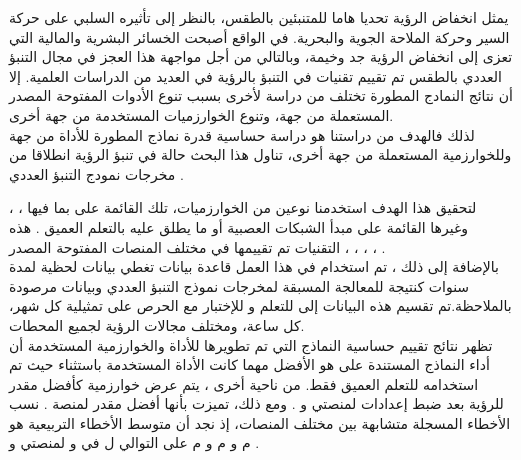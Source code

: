 \documentclass[11pt,a4paper]{report}
\begin{document}
\thispagestyle{empty}

\begin{otherlanguage}{arabic}
يمثل انخفاض الرؤية تحديا هاما للمتنبئين بالطقس، بالنظر إلى تأثيره السلبي على حركة السير وحركة الملاحة الجوية والبحرية. في الواقع أصبحت الخسائر البشرية والمالية التي تعزى إلى انخفاض الرؤية جد وخيمة، وبالتالي من أجل مواجهة هذا العجز في مجال التنبؤ العددي بالطقس تم تقييم تقنيات  في التنبؤ بالرؤية  في العديد من الدراسات العلمية. إلا أن نتائج النمادج المطورة تختلف من دراسة لأخرى بسبب تنوع الأدوات  المفتوحة المصدر المستعملة من جهة، وتنوع الخوارزميات  المستخدمة من جهة أخرى.
\\

لذلك فالهدف من دراستنا هو دراسة حساسية قدرة نماذج   المطورة للأداة من جهة وللخوارزمية المستعملة من جهة أخرى، تناول هذا البحث حالة  في تنبؤ الرؤية انطلاقا من مخرجات نمودج التنبؤ العددي .

 لتحقيق هذا الهدف استخدمنا نوعين من الخوارزميات، تلك القائمة على  بما فيها ، ،  وغيرها القائمة على مبدأ الشبكات العصبية أو ما يطلق عليه بالتعلم العميق . هذه التقنيات تم تقييمها في مختلف المنصات المفتوحة المصدر ، ، ، ، . \\
بالإضافة إلى ذلك ، تم استخدام في هذا العمل قاعدة بيانات تغطي بيانات لحظية لمدة  سنوات كنتيجة للمعالجة المسبقة لمخرجات نموذج التنبؤ العددي  وبيانات مرصودة بالملاحظة.تم تقسيم هذه البيانات إلى  للتعلم و  للإختبار مع الحرص على تمثيلية كل شهر، كل ساعة، ومختلف مجالات الرؤية لجميع المحطات.
\\

تظهر نتائج تقييم حساسية النماذج التي تم تطويرها للأداة والخوارزمية المستخدمة أن أداء النماذج المستندة على  هو الأفضل مهما كانت الأداة المستخدمة باستثناء  حيث تم استخدامه للتعلم العميق فقط. من ناحية أخرى ، يتم عرض خوارزمية  كأفضل مقدر للرؤية بعد ضبط إعدادات  لمنصتي  و . ومع ذلك،  تميزت بأنها أفضل مقدر لمنصة . نسب الأخطاء المسجلة متشابهة بين مختلف المنصات، إذ نجد أن متوسط الأخطاء التربيعية هو م و  م و  م على التوالي ل  في  و  لمنصتي  و .\

\end{otherlanguage}
\end{document}
